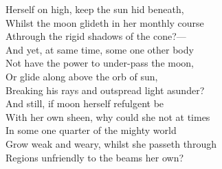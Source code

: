 Herself on high, keep the sun hid beneath,\\
Whilst the moon glideth in her monthly course\\
Athrough the rigid shadows of the cone?—\\
And yet, at same time, some one other body\\
Not have the power to under-pass the moon,\\
Or glide along above the orb of sun,\\
Breaking his rays and outspread light asunder?\\
And still, if moon herself refulgent be\\
With her own sheen, why could she not at times\\
In some one quarter of the mighty world\\
Grow weak and weary, whilst she passeth through\\
Regions unfriendly to the beams her own?


